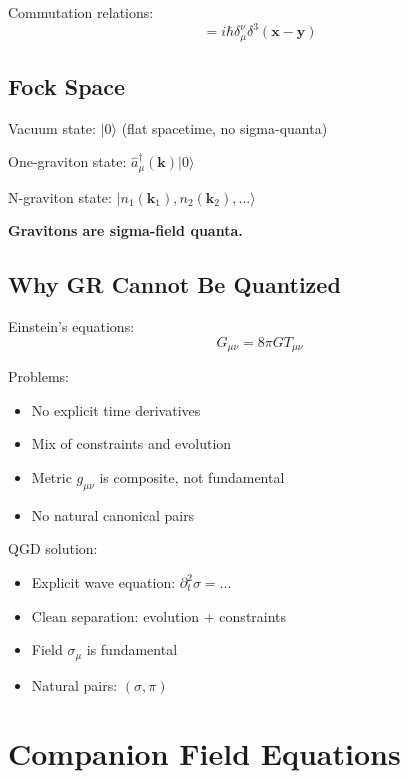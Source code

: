 \documentclass[11pt,a4paper]{article}
\theoremstyle{definition}
\theoremstyle{remark}
\begin{document}
		Commutation relations:
		\begin{equation}
			[\hat{\sigma}_\mu(x,t), \hat{\pi}^\nu(y,t)] = i\hbar\delta^\nu_\mu\delta^3(\mathbf{x}-\mathbf{y})
		\end{equation}
		
		\subsection{Fock Space}
		
		Vacuum state: $|0\rangle$ (flat spacetime, no sigma-quanta)
		
		One-graviton state: $\hat{a}^\dagger_\mu(\mathbf{k})|0\rangle$
		
		N-graviton state: $|n_1(\mathbf{k}_1), n_2(\mathbf{k}_2), ...\rangle$
		
		\textbf{Gravitons are sigma-field quanta.}
		
		\subsection{Why GR Cannot Be Quantized}
		
		Einstein's equations:
		\begin{equation}
			G_{\mu\nu} = 8\pi GT_{\mu\nu}
		\end{equation}
		
		Problems:
		\begin{itemize}
			\item No explicit time derivatives
			\item Mix of constraints and evolution
			\item Metric $g_{\mu\nu}$ is composite, not fundamental
			\item No natural canonical pairs
		\end{itemize}
		
		QGD solution:
		\begin{itemize}
			\item Explicit wave equation: $\partial_t^2\sigma = ...$
			\item Clean separation: evolution + constraints
			\item Field $\sigma_\mu$ is fundamental
			\item Natural pairs: $(\sigma, \pi)$
		\end{itemize}
		
		\section{Companion Field Equations}
		
\end{document}
